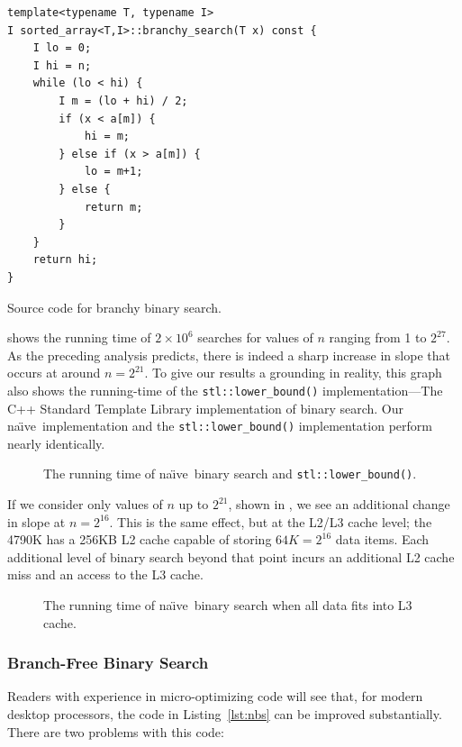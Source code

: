 \documentclass{patmorin}
\newcommand{\lstlabel}[1]{\label{lst:#1}}
\newcommand{\lstref}[1]{Listing~\ref{lst:#1}}
\newcommand{\naive}{na\"{\i}ve}
\begin{document}
\begin{listing}
\begin{verbatim}
template<typename T, typename I>
I sorted_array<T,I>::branchy_search(T x) const {
    I lo = 0;
    I hi = n;
    while (lo < hi) {
        I m = (lo + hi) / 2;
        if (x < a[m]) {
            hi = m;
        } else if (x > a[m]) {
            lo = m+1;
        } else {
            return m;
        }
    }
    return hi;
}
\end{verbatim}
\caption{Source code for branchy binary search.}
\lstlabel{nbs}
\end{listing}


 shows the running time of $2\times 10^6$ searches
for values of $n$ ranging from 1 to $2^{27}$. As the preceding analysis
predicts, there is indeed a sharp increase in slope that occurs at around
$n=2^{21}$.  To give our results a grounding in reality, this graph
also shows the running-time of the \texttt{stl::lower_bound()}
implementation---The C++ Standard Template Library implementation
of binary search.  Our \naive\ implementation and the
\texttt{stl::lower_bound()} implementation perform nearly
identically.


\begin{figure}
   \caption{The running time of \naive\ binary search and 
            \texttt{stl::lower_bound()}.}
\end{figure}

If we consider only values of $n$ up to $2^{21}$, shown in
, we see an additional change in slope at
$n=2^{16}$.  This is the same effect, but at the L2/L3 cache level; the
4790K has a 256KB L2 cache capable of storing $64K=2^{16}$ data items.
Each additional level of binary search beyond that point incurs an
additional L2 cache miss and an access to the L3 cache.

\begin{figure}
   \caption{The running time of \naive\ binary search when all data
    fits into L3 cache.}
\end{figure}


\subsubsection{Branch-Free Binary Search}

Readers with experience in micro-optimizing code will see that, for
modern desktop processors, the code in \lstref{nbs} can be improved
substantially.  There are two problems with this code:
\end{document}
